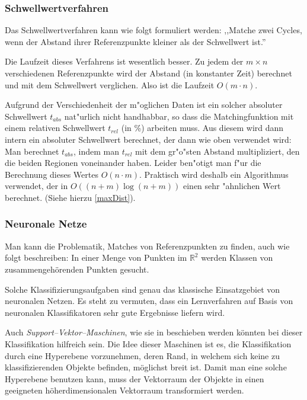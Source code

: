 \subsubsection*{Schwellwertverfahren}\label{Schwellwert}

Das Schwellwertverfahren kann wie folgt formuliert werden: ,,Matche zwei Cycles, wenn der Abstand ihrer Referenzpunkte kleiner als der Schwellwert ist.''

Die Laufzeit dieses Verfahrens ist wesentlich besser. Zu jedem der $m\times n$ verschiedenen  Referenzpunkte wird der  Abstand (in konstanter Zeit) berechnet und mit dem Schwellwert verglichen. Also ist die Laufzeit $O(m\cdot n)$.

Aufgrund der Verschiedenheit der m"oglichen Daten ist ein solcher absoluter Schwellwert $t_{abs}$ nat"urlich nicht handhabbar, so dass die Matchingfunktion mit einem relativen Schwellwert $t_{rel}$ (in \%) arbeiten muss. Aus diesem wird dann intern ein absoluter Schwellwert berechnet, der dann wie oben verwendet wird: Man berechnet $t_{abs}$, indem man $t_{rel}$ mit dem gr"o"sten Abstand multipliziert, den die beiden Regionen voneinander haben. Leider ben"otigt man f"ur die Berechnung dieses Wertes $O(n\cdot m)$. Praktisch wird deshalb ein Algorithmus verwendet, der in $O((n+m)\log{(n+m)})$ einen sehr "ahnlichen Wert berechnet. (Siehe hierzu \vref{maxDist}).

\subsubsection*{Neuronale Netze}\label{neuroNetz}

Man kann die Problematik, Matches von Referenzpunkten zu finden, auch wie folgt beschreiben: In einer Menge von Punkten im $\mathbb{R}^2$ werden Klassen von zusammengehörenden Punkten gesucht.

Solche Klassifizierungsaufgaben sind genau das klassische Einsatzgebiet von neuronalen Netzen. Es steht zu vermuten, dass ein Lernverfahren auf Basis von neuronalen Klassifikatoren sehr gute Ergebnisse liefern wird. 

Auch \textit{Support--Vektor--Maschinen}, wie sie in \cite{SchSm} beschieben werden könnten bei dieser Klassifikation hilfreich sein. Die Idee dieser Maschinen ist es, die Klassifikation durch eine Hyperebene vorzunehmen, deren Rand, in welchem sich keine zu klassifizierenden Objekte befinden, möglichst breit ist. Damit man eine solche Hyperebene benutzen kann, muss der Vektorraum der Objekte in einen geeigneten höherdimensionalen Vektorraum transformiert werden. 

